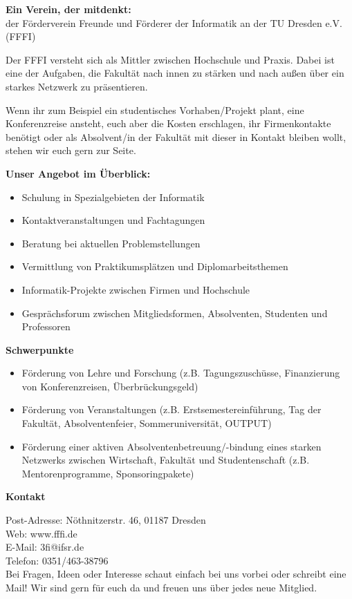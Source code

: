 
\textbf{Ein Verein, der mitdenkt:} \\
der Förderverein Freunde und Förderer der Informatik an der TU Dresden e.V. (FFFI)

Der FFFI versteht sich als Mittler zwischen Hochschule und Praxis.
Dabei ist eine der Aufgaben, die Fakultät nach innen zu stärken und nach außen über ein starkes Netzwerk zu präsentieren.

Wenn ihr zum Beispiel ein studentisches Vorhaben/Projekt plant, eine Konferenzreise ansteht, euch aber die Kosten erschlagen, ihr Firmenkontakte benötigt oder als Absolvent/in der Fakultät mit dieser in Kontakt bleiben wollt, stehen wir euch gern zur Seite.

\textbf{Unser Angebot im Überblick:}

\begin{itemize}
\item Schulung in Spezialgebieten der Informatik
\item Kontaktveranstaltungen und Fachtagungen
\item Beratung bei aktuellen Problemstellungen
\item Vermittlung von Praktikumsplätzen und Diplomarbeitsthemen
\item Informatik-Projekte zwischen Firmen und Hochschule
\item Gesprächsforum zwischen Mitgliedsformen, Absolventen, Studenten und Professoren
\end{itemize}

\textbf{Schwerpunkte}

\begin{itemize}
\item Förderung von Lehre und Forschung (z.B. Tagungszuschüsse, Finanzierung von Konferenzreisen, Überbrückungsgeld)
\item Förderung von Veranstaltungen (z.B. Erstsemestereinführung, Tag der Fakultät, Absolventenfeier, Sommeruniversität, OUTPUT)
\item Förderung einer aktiven Absolventenbetreuung/-bindung eines starken Netzwerks zwischen Wirtschaft, Fakultät und Studentenschaft (z.B. Mentorenprogramme, Sponsoringpakete)
\end{itemize}

\textbf{Kontakt}

Post-Adresse: Nöthnitzerstr. 46, 01187 Dresden \\
Web: www.fffi.de \\
E-Mail: 3fi@ifsr.de \\
Telefon: 0351/463-38796 \\

Bei Fragen, Ideen oder Interesse schaut einfach bei uns vorbei oder schreibt eine Mail!
Wir sind gern für euch da und freuen uns über jedes neue Mitglied.

